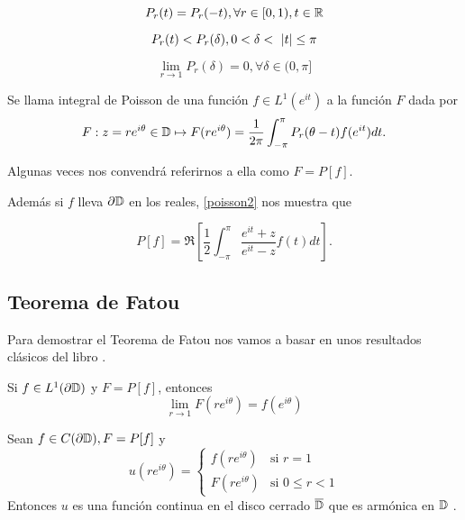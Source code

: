 \begin{equation}
    P_r(t) = P_r(-t), \forall r \in [0,1), t \in \mathbb{R}
\end{equation}

\begin{equation}
    P_r(t) < P_r(\delta), 0 < \delta < \abs{t} \leq \pi
\end{equation}

\begin{equation}
    \lim_{r \rightarrow 1} P_r(\delta) = 0, \forall \delta \in (0,\pi]
\end{equation}

\bigskip \par

\begin{definition}
    Se llama integral de Poisson de una función $f \in L^1(e^{it})$ a la función $F$ dada por
    \begin{equation*}
        F: z=re^{i \theta} \in \mathbb{D} \mapsto F(re^{i \theta}) = \dfrac{1}{2 \pi} \int_{- \pi}^{\pi} P_r (\theta - t) f(e^{it}) dt.
    \end{equation*}

    Algunas veces nos convendrá referirnos a ella como $F=P[f]$.
\end{definition}

\bigskip

Además si $f$ lleva $\partial \mathbb{D}$ en los reales, \ref{poisson2} nos muestra que

\begin{equation*}
     P[f] = \Re \left[ \dfrac{1}{2} \int_{-\pi}^{\pi} \dfrac{e^{it} + z}{e^{it} - z} f(t) dt \right].
\end{equation*}

\subsection{Teorema de Fatou}

Para demostrar el Teorema de Fatou nos vamos a basar en unos resultados clásicos del libro \citet[chap. 11]{rudin}.

\begin{theorem}
    \label{fatouaux1}
    Si $f \in L^1(\partial \mathbb{D})$ y $F = P[f]$, entonces
    \begin{equation*}
        \lim_{r \rightarrow 1} F(re^{i \theta}) = f(e^{i \theta})
    \end{equation*}
\end{theorem}

\begin{theorem}
    \label{fatouaux2}
    Sean $f \in C (\partial \mathbb{D}), F=P[f]$ y
    \begin{equation*}
        u(re^{i \theta}) =
        \begin{cases}
            f(re^{i\theta}) & \text{si } r=1\\ F(re^{i\theta}) & \text{si } 0 \leq r<1
        \end{cases}
    \end{equation*}
    Entonces $u$ es una función continua en el disco cerrado $\overline{\mathbb{D}}$ que es armónica en $\mathbb{D}$ .
\end{theorem}

